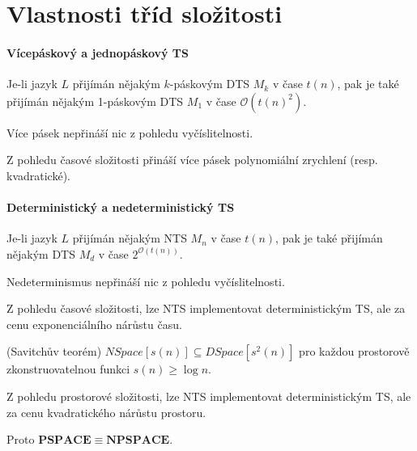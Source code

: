 
\section{Vlastnosti tříd složitosti}

\paragraph*{Vícepáskový a jednopáskový TS} \begin{compactitem}
    \item Je-li jazyk $L$ přijímán nějakým $k$-páskovým DTS $M_k$ v čase $t(n)$, pak je také přijímán nějakým 1-páskovým DTS $M_1$ v čase $\mathcal{O}(t(n)^2)$. \begin{compactitem}
        \item Více pásek nepřináší nic z pohledu vyčíslitelnosti.
        \item Z pohledu časové složitosti přináší více pásek polynomiální zrychlení (resp. kvadratické).
    \end{compactitem}
\end{compactitem}

\paragraph*{Deterministický a nedeterministický TS} \begin{compactitem}

    \item Je-li jazyk $L$ přijímán nějakým NTS $M_n$ v čase $t(n)$, pak je také přijímán nějakým DTS $M_d$ v čase $2^{\mathcal{O}(t(n))}$. \begin{compactitem}
        \item Nedeterminismus nepřináší nic z pohledu vyčíslitelnosti.
        \item Z pohledu časové složitosti, lze NTS implementovat deterministickým TS, ale za cenu exponenciálního nárůstu času.
    \end{compactitem}

    \item (Savitchův teorém) $NSpace[s(n)] \subseteq DSpace[s^2 (n)]$ pro každou prostorově zkonstruovatelnou funkci $s(n) \geq \log{n}$.\begin{compactitem}
        \item Z pohledu prostorové složitosti, lze NTS implementovat deterministickým TS, ale za cenu kvadratického nárůstu prostoru.
        \item Proto $\mathbf{PSPACE} \equiv \mathbf{NPSPACE}$.
    \end{compactitem}
\end{compactitem}

